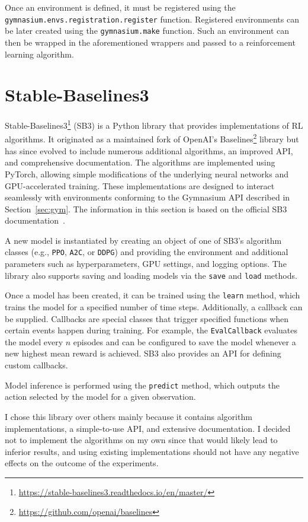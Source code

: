 \documentclass[
  digital,     %
  oneside,     %
  nosansbold,  %
  nocolorbold, %
  lof,         %
  lot,         %
]{fithesis4}
\begin{document}
Once an environment is defined, it must be registered using the \texttt{gymnasium.envs.registration.register} function. Registered environments can be later created using the \texttt{gymnasium.make} function. Such an environment can then be wrapped in the aforementioned wrappers and passed to a reinforcement learning algorithm.

\section{Stable-Baselines3}
Stable-Baselines3\footnote{\url{https://stable-baselines3.readthedocs.io/en/master/}} (SB3) is a Python library that provides implementations of RL algorithms. It originated as a maintained fork of OpenAI's Baselines\footnote{\url{https://github.com/openai/baselines}} library but has since evolved to include numerous additional algorithms, an improved API, and comprehensive documentation. The algorithms are implemented using PyTorch, allowing simple modifications of the underlying neural networks and GPU-accelerated training. These implementations are designed to interact seamlessly with environments conforming to the Gymnasium API described in Section~\ref{sec:gym}. The information in this section is based on the official SB3 documentation~\cite{SB3-docs}.

A new model is instantiated by creating an object of one of SB3’s algorithm classes (e.g., \texttt{PPO}, \texttt{A2C}, or \texttt{DDPG}) and providing the environment and additional parameters such as hyperparameters, GPU settings, and logging options. The library also supports saving and loading models via the \texttt{save} and \texttt{load} methods.

Once a model has been created, it can be trained using the \texttt{learn} method, which trains the model for a specified number of time steps. Additionally, a callback can be supplied. Callbacks are special classes that trigger specified functions when certain events happen during training. For example, the \texttt{EvalCallback} evaluates the model every $n$ episodes and can be configured to save the model whenever a new highest mean reward is achieved. SB3 also provides an API for defining custom callbacks.

Model inference is performed using the \texttt{predict} method, which outputs the action selected by the model for a given observation.

I chose this library over others mainly because it contains algorithm implementations, a simple-to-use API, and extensive documentation. I decided not to implement the algorithms on my own since that would likely lead to inferior results, and using existing implementations should not have any negative effects on the outcome of the experiments.
\end{document}

